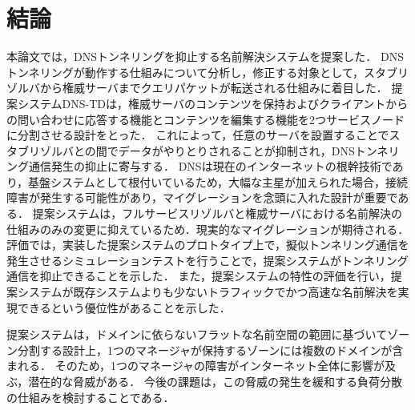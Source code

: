 \section{結論}
本論文では，DNSトンネリングを抑止する名前解決システムを提案した．
DNSトンネリングが動作する仕組みについて分析し，修正する対象として，スタブリゾルバから権威サーバまでクエリパケットが転送される仕組みに着目した．
提案システムDNS-TDは，権威サーバのコンテンツを保持およびクライアントからの問い合わせに応答する機能とコンテンツを編集する機能を2つサービスノードに分割させる設計をとった．
これによって，任意のサーバを設置することでスタブリゾルバとの間でデータがやりとりされることが抑制され，DNSトンネリング通信発生の抑止に寄与する．
DNSは現在のインターネットの根幹技術であり，基盤システムとして根付いているため，大幅な主星が加えられた場合，接続障害が発生する可能性があり，マイグレーションを念頭に入れた設計が重要である．
提案システムは，フルサービスリゾルバと権威サーバにおける名前解決の仕組みのみの変更に抑えているため．現実的なマイグレーションが期待される．
評価では，実装した提案システムのプロトタイプ上で，擬似トンネリング通信を発生させるシミュレーションテストを行うことで，提案システムがトンネリング通信を抑止できることを示した．
また，提案システムの特性の評価を行い，提案システムが既存システムよりも少ないトラフィックでかつ高速な名前解決を実現できるという優位性があることを示した．

提案システムは，ドメインに依らないフラットな名前空間の範囲に基づいてゾーン分割する設計上，1つのマネージャが保持するゾーンには複数のドメインが含まれる．
そのため，1つのマネージャの障害がインターネット全体に影響が及ぶ，潜在的な脅威がある．
今後の課題は，この脅威の発生を緩和する負荷分散の仕組みを検討することである．
